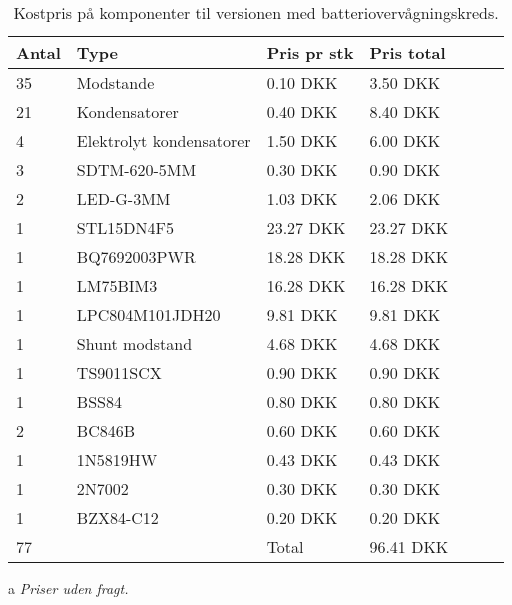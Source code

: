 \begin{table}[h!]
	\small
	\centering
	\begin{threeparttable}
		\begin{tabular}{ l l l l l l l }
			\toprule
			\multicolumn{1}{l}{\textbf{Antal}}        &
			\multicolumn{1}{l}{\textbf{Type}}         &
			\multicolumn{1}{l}{\textbf{Pris pr stk}}  &
			\multicolumn{1}{l}{\textbf{Pris total}}   \\ 
			\hline
			35 &  Modstande                 &  0.10 DKK   &  3.50 DKK  \\
			21 &  Kondensatorer             &  0.40 DKK   &  8.40 DKK  \\
			4  &  Elektrolyt kondensatorer  &  1.50 DKK   &  6.00 DKK  \\
			3  &  SDTM-620-5MM              &  0.30 DKK   &  0.90 DKK  \\
			2  &  LED-G-3MM                 &  1.03 DKK   &  2.06 DKK  \\
			1  &  STL15DN4F5                & 23.27 DKK   & 23.27 DKK  \\
			1  &  BQ7692003PWR              & 18.28 DKK   & 18.28 DKK  \\
			1  &  LM75BIM3                  & 16.28 DKK   & 16.28 DKK  \\
			1  &  LPC804M101JDH20           &  9.81 DKK   &  9.81 DKK  \\
			1  &  Shunt modstand            &  4.68 DKK   &  4.68 DKK  \\
			1  &  TS9011SCX                 &  0.90 DKK   &  0.90 DKK  \\
			1  &  BSS84                     &  0.80 DKK   &  0.80 DKK  \\
			2  &  BC846B                    &  0.60 DKK   &  0.60 DKK  \\
			1  &  1N5819HW                &  0.43 DKK   &  0.43 DKK  \\
			1  &  2N7002                    &  0.30 DKK   &  0.30 DKK  \\
			1  &  BZX84-C12                 &  0.20 DKK   &  0.20 DKK  \\  
			\hline
		   77  &                            & Total       & 96.41 DKK  \\  
			\hline
			\bottomrule
		\end{tabular}
		\begin{tablenotes}
			\item[a] \textit{Priser uden fragt.}
		\end{tablenotes}
		\caption{Kostpris på komponenter til versionen med batteriovervågningskreds.}
		\label{tab:pris_ic}
	\end{threeparttable}
\end{table} 
\FloatBlock

